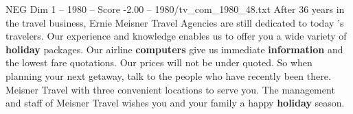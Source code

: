 \begin{textsample}{NEG Dim 1 – 1980 – Score -2.00 – 1980/tv\_com\_1980\_48.txt}  \label{ex:f1_neg_051}
After 36 years in the travel business, Ernie Meisner Travel Agencies are still dedicated to today 's travelers.
Our experience and knowledge enables us to offer you a wide variety of \textbf{holiday} packages.
Our airline \textbf{computers} give us immediate \textbf{information} and the lowest fare quotations.
Our prices will not be under quoted.
So when planning your next getaway, talk to the people who have recently been there.
Meisner Travel with three convenient locations to serve you.
The management and staff of Meisner Travel wishes you and your family a happy \textbf{holiday} season.

\end{textsample}
